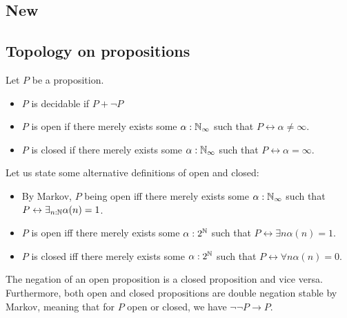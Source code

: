 \subsection{New}
\subsection{Topology on propositions}
\begin{definition}
  Let $P$ be a proposition. 
  \begin{itemize}
    \item $P$ is decidable if $P + \neg P$
    \item $P$ is open if there merely exists some $\alpha:\mathbb{N}_{\infty}$ such that $P \leftrightarrow \alpha \neq \infty$. 
    \item $P$ is closed if there merely exists some $\alpha:\mathbb{N}_{\infty}$ such that $P \leftrightarrow \alpha = \infty$. 
  \end{itemize}
\end{definition}

\begin{remark}
  Let us state some alternative definitions of open and closed:
  \begin{itemize}
    \item 
      By Markov, $P$ being open iff there merely exists some $\alpha:\mathbb{N}_{\infty}$ such that 
      $P\leftrightarrow \exists_{n:\mathbb{N}} \alpha(n) = 1$. 
    \item 
      $P$ is open iff there merely exists some $\alpha:2^{\mathbb{N}}$ such that $P\leftrightarrow \exists n \alpha(n) = 1$.
    \item 
      $P$ is closed iff there merely exists some $\alpha:2^{\mathbb{N}}$ such that $P\leftrightarrow \forall n \alpha(n) = 0$.
\end{itemize}
\end{remark}

\begin{remark}\label{rmkOpenClosedNegation}
  The negation of an open proposition is a closed proposition and vice versa. 
  Furthermore, both open and closed propositions are double negation stable by Markov, 
  meaning that for $P$ open or closed, we have $\neg \neg P \to P$.
\end{remark}

